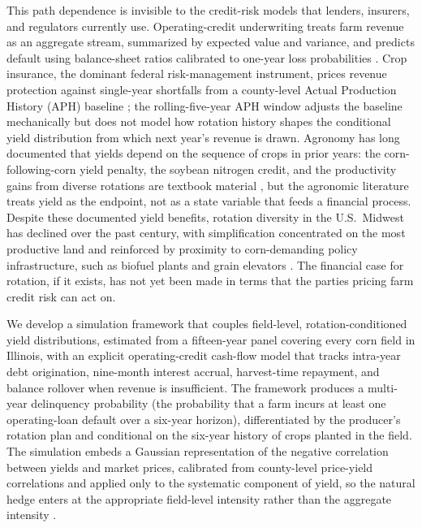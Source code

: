 \documentclass[11pt,letterpaper]{article}
\theoremstyle{remark}
\begin{document}
This path dependence is invisible to the credit-risk models that lenders, insurers, and regulators currently use. Operating-credit underwriting treats farm revenue as an aggregate stream, summarized by expected value and variance, and predicts default using balance-sheet ratios calibrated to one-year loss probabilities \citep{Featherstone2006}. Crop insurance, the dominant federal risk-management instrument, prices revenue protection against single-year shortfalls from a county-level Actual Production History (APH) baseline \citep{Goodwin2004}; the rolling-five-year APH window adjusts the baseline mechanically but does not model how rotation history shapes the conditional yield distribution from which next year's revenue is drawn. Agronomy has long documented that yields depend on the sequence of crops in prior years: the corn-following-corn yield penalty, the soybean nitrogen credit, and the productivity gains from diverse rotations are textbook material \citep{Bullock1992, Seifert2017}, but the agronomic literature treats yield as the endpoint, not as a state variable that feeds a financial process. Despite these documented yield benefits, rotation diversity in the U.S.\ Midwest has declined over the past century, with simplification concentrated on the most productive land and reinforced by proximity to corn-demanding policy infrastructure, such as biofuel plants and grain elevators \citep{socolar2021}. The financial case for rotation, if it exists, has not yet been made in terms that the parties pricing farm credit risk can act on.
 
We develop a simulation framework that couples field-level, rotation-conditioned yield distributions, estimated from a fifteen-year panel covering every corn field in Illinois, with an explicit operating-credit cash-flow model that tracks intra-year debt origination, nine-month interest accrual, harvest-time repayment, and balance rollover when revenue is insufficient. The framework produces a multi-year delinquency probability (the probability that a farm incurs at least one operating-loan default over a six-year horizon), differentiated by the producer's rotation plan and conditional on the six-year history of crops planted in the field. The simulation embeds a Gaussian representation of the negative correlation between yields and market prices, calibrated from county-level price-yield correlations and applied only to the systematic component of yield, so the natural hedge enters at the appropriate field-level intensity rather than the aggregate intensity \citep{Finger2012, Ramsey2019}.
 
\end{document}
